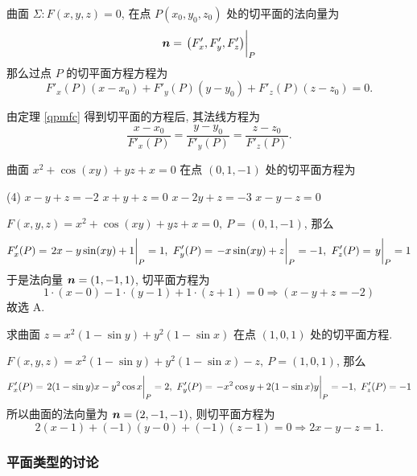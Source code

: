 \begin{theorem}[切平面方程]
    曲面 $\varSigma:F(x,y,z)=0$, 在点 $P(x_0,y_0,z_0)$ 处的切平面的法向量为
    $$\vb*{n}=\eval{\qty(F'_x,F'_y,F'_z)}_{P}$$
    那么过点 $P$ 的切平面方程方程为 
    $$F'_x(P)(x-x_0)+F'_y(P)(y-y_0)+F'_z(P)(z-z_0)=0.$$
    \label{qpmfc}
\end{theorem}

\begin{theorem}[法线方程]
    由定理 \ref{qpmfc} 得到切平面的方程后, 其法线方程为 $$\dfrac{x-x_0}{F'_x(P)}=\dfrac{y-y_0}{F'_y(P)}=\dfrac{z-z_0}{F'_z(P)}.$$
\end{theorem}

\begin{example}[2013 数一]
    曲面 $x^2+\cos(xy)+yz+x=0$ 在点 $(0,1,-1)$ 处的切平面方程为
    \begin{tasks}(4)
        \task $x-y+z=-2$
        \task $x+y+z=0$
        \task $x-2y+z=-3$
        \task $x-y-z=0$
    \end{tasks}
\end{example}
\begin{solution}
    $F(x,y,z)=x^2+\cos(xy)+yz+x=0,~P=(0,1,-1)$, 那么 
    $$F'_x(P)=\eval{2x-y\sin(xy)+1}_{P}=1,~F'_y(P)=\eval{-x\sin(xy)+z}_{P}=-1,~F'_z(P)=\eval{y}_{P}=1$$
    于是法向量 $\vb*{n}=(1,-1,1)$, 切平面方程为 $$1\cdot(x-0)-1\cdot(y-1)+1\cdot(z+1)=0\Rightarrow(x-y+z=-2)$$
    故选 A.
\end{solution}

\begin{example}[2014 数一]
    求曲面 $z=x^2(1-\sin y)+y^2(1-\sin x)$ 在点 $(1,0,1)$ 处的切平面方程.
\end{example}
\begin{solution}
    $F(x,y,z)=x^2(1-\sin y)+y^2(1-\sin x)-z,~P=(1,0,1)$, 那么 
    $$F'_x(P)=\eval{2(1-\sin y)x-y^2\cos x}_{P}=2,~F'_y(P)=\eval{-x^2\cos y+2(1-\sin x)y}_{P}=-1,~F'_z(P)=-1$$
    所以曲面的法向量为 $\vb*{n}=(2,-1,-1)$, 则切平面方程为 $$2(x-1)+(-1)(y-0)+(-1)(z-1)=0\Rightarrow 2x-y-z=1.$$
\end{solution}

\subsubsection{平面类型的讨论}

